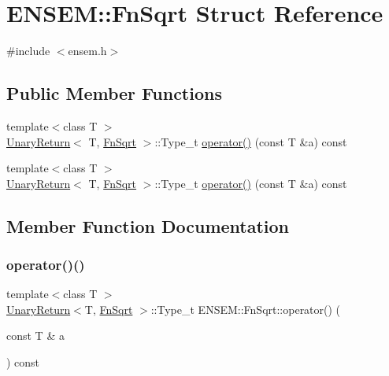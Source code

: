 \hypertarget{structENSEM_1_1FnSqrt}{}\section{E\+N\+S\+EM\+:\+:Fn\+Sqrt Struct Reference}
\label{structENSEM_1_1FnSqrt}


{\ttfamily \#include $<$ensem.\+h$>$}

\subsection*{Public Member Functions}
\begin{DoxyCompactItemize}
\item 
{\footnotesize template$<$class T $>$ }\\\mbox{\hyperlink{structENSEM_1_1UnaryReturn}{Unary\+Return}}$<$ T, \mbox{\hyperlink{structENSEM_1_1FnSqrt}{Fn\+Sqrt}} $>$\+::Type\+\_\+t \mbox{\hyperlink{structENSEM_1_1FnSqrt_acec9d842c8abf3aff70bc3c16a5473ce}{operator()}} (const T \&a) const
\item 
{\footnotesize template$<$class T $>$ }\\\mbox{\hyperlink{structENSEM_1_1UnaryReturn}{Unary\+Return}}$<$ T, \mbox{\hyperlink{structENSEM_1_1FnSqrt}{Fn\+Sqrt}} $>$\+::Type\+\_\+t \mbox{\hyperlink{structENSEM_1_1FnSqrt_acec9d842c8abf3aff70bc3c16a5473ce}{operator()}} (const T \&a) const
\end{DoxyCompactItemize}


\subsection{Member Function Documentation}
\mbox{\label{structENSEM_1_1FnSqrt_acec9d842c8abf3aff70bc3c16a5473ce}} 
\subsubsection{\texorpdfstring{operator()()}{operator()()}\hspace{0.1cm}{\footnotesize\ttfamily [1/2]}}
{\footnotesize\ttfamily template$<$class T $>$ \\
\mbox{\hyperlink{structENSEM_1_1UnaryReturn}{Unary\+Return}}$<$T, \mbox{\hyperlink{structENSEM_1_1FnSqrt}{Fn\+Sqrt}} $>$\+::Type\+\_\+t E\+N\+S\+E\+M\+::\+Fn\+Sqrt\+::operator() (\begin{DoxyParamCaption}\item[{const T \&}]{a }\end{DoxyParamCaption}) const\hspace{0.3cm}{\ttfamily [inline]}}

